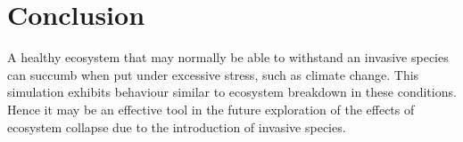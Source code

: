 \documentclass[12pt]{article}
\begin{document}
\section{Conclusion}
A healthy ecosystem that may normally be able to
withstand an invasive species can succumb when put under excessive
stress, such as climate change. This simulation exhibits behaviour
similar to ecosystem breakdown in these conditions. Hence it may be
an effective tool in the future exploration of the effects of ecosystem
collapse due to the introduction of invasive species.











\end{document}
